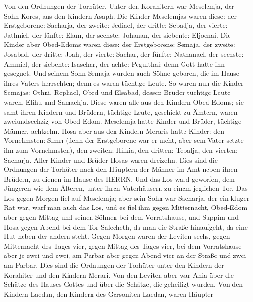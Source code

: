  Von den Ordnungen der Torhüter. Unter den Korahitern war
Meselemja, der Sohn Kores, aus den Kindern Asaph.  Die
Kinder Meselemjas waren diese: der Erstgeborene: Sacharja, der zweite:
Jediael, der dritte: Sebadja, der vierte: Jathniel,  der
fünfte: Elam, der sechste: Johanan, der siebente: Eljoenai. 
Die Kinder aber Obed-Edoms waren diese: der Erstgeborene: Semaja, der
zweite: Josabad, der dritte: Joah, der vierte: Sachar, der fünfte:
Nathanael,  der sechste: Ammiel, der siebente: Isaschar, der
achte: Pegulthai; denn Gott hatte ihn gesegnet.  Und seinem
Sohn Semaja wurden auch Söhne geboren, die im Hause ihres Vaters
herrschten; denn es waren tüchtige Leute.  So waren nun die
Kinder Semajas: Othni, Rephael, Obed und Elsabad, dessen Brüder tüchtige
Leute waren, Elihu und Samachja.  Diese waren alle aus den
Kindern Obed-Edoms; sie samt ihren Kindern und Brüdern, tüchtige Leute,
geschickt zu Ämtern, waren zweiundsechzig von Obed-Edom. 
Meselemja hatte Kinder und Brüder, tüchtige Männer, achtzehn.
 Hosa aber aus den Kindern Meraris hatte Kinder: den
Vornehmsten: Simri (denn der Erstgeborene war er nicht, aber sein Vater
setzte ihn zum Vornehmsten),  den zweiten: Hilkia, den
dritten: Tebalja, den vierten: Sacharja. Aller Kinder und Brüder Hosas
waren dreizehn.  Dies sind die Ordnungen der Torhüter nach
den Häuptern der Männer im Amt neben ihren Brüdern, zu dienen im Hause
des HERRN.  Und das Los ward geworfen, dem Jüngeren wie dem
Älteren, unter ihren Vaterhäusern zu einem jeglichen Tor. 
Das Los gegen Morgen fiel auf Meselemja; aber sein Sohn war Sacharja,
der ein kluger Rat war, warf man auch das Los, und es fiel ihm gegen
Mitternacht,  Obed-Edom aber gegen Mittag und seinen Söhnen
bei dem Vorratshause,  und Suppim und Hosa gegen Abend bei
dem Tor Salecheth, da man die Straße hinaufgeht, da eine Hut neben der
andern steht.  Gegen Morgen waren der Leviten sechs, gegen
Mitternacht des Tages vier, gegen Mittag des Tages vier, bei dem
Vorratshause aber je zwei und zwei,  am Parbar aber gegen
Abend vier an der Straße und zwei am Parbar.  Dies sind die
Ordnungen der Torhüter unter den Kindern der Korahiter und den Kindern
Merari.  Von den Leviten aber war Ahia über die Schätze des
Hauses Gottes und über die Schätze, die geheiligt wurden. 
Von den Kindern Laedan, den Kindern des Gersoniten Laedan, waren Häupter

